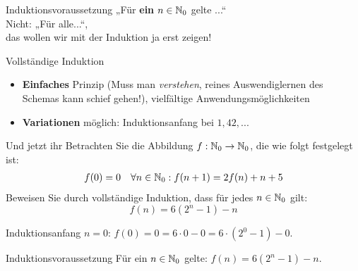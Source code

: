 \begin{frame}{Induktionsvoraussetzung}
	\Huge \centering
	\alert{
		„Für \textbf{ein} $n \in \mathbb{N}_0$ gelte ...“ \\
		\bigskip
		{ \LARGE
		Nicht: „Für alle...“,\\
		das wollen wir mit der Induktion ja erst zeigen!
		}
	}
\end{frame}

\begin{frame}[t]{Vollständige Induktion}
	\begin{itemize}
		\item \textbf{Einfaches} Prinzip (Muss man \textit{verstehen}, reines Auswendiglernen des Schemas kann schief gehen!), vielfältige Anwendungsmöglichkeiten
		\item \textbf{Variationen} möglich: Induktionsanfang bei $1, 42, ...$
	\end{itemize}
	
\end{frame}

%


\begin{frame}{Und jetzt ihr}
    Betrachten Sie die Abbildung $f: \mathbb{N}_0 \to \mathbb{N}_0$, die wie folgt festgelegt ist:
    \begin{align*}
        f(0) = 0&&\forall n \in \mathbb{N}_0: f(n+1) = 2f(n) + n + 5
    \end{align*}
    Beweisen Sie durch vollständige Induktion, dass für jedes $n \in \mathbb{N}_0$ gilt:
    \[f(n) = 6(2^n - 1) - n\]
	\pause
	\begin{block}{Induktionsanfang}
		$n = 0$: $f(0)=0 = 6 \cdot 0 - 0 = 6 \cdot (2^0 - 1) - 0 $. \; \textbf{\checked}
	\end{block}
	\pause
	\begin{block}{Induktionsvoraussetzung}
		Für ein $n \in \mathbb{N}_0$ gelte: $f(n) = 6(2^n - 1) - n$.
	\end{block}
\end{frame}


